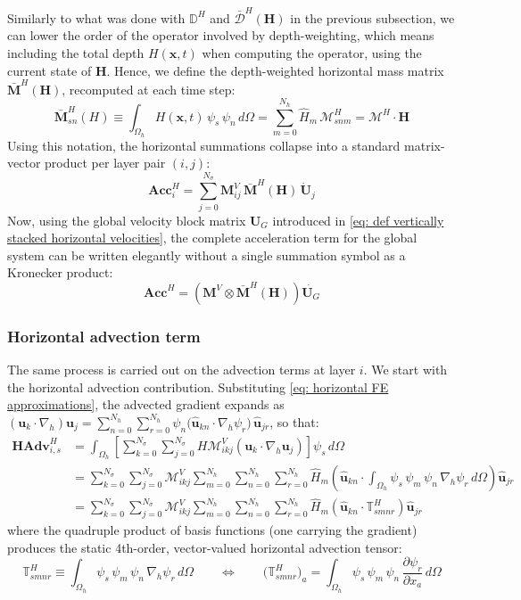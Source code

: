 \documentclass{article}
\newcommand{\Ns}{N_\sigma}
\newcommand{\uj}{\mathbf{u}_j}
\newcommand{\uk}{\mathbf{u}_k}
\newcommand{\sumj}{\sum_{j=0}^{\Ns}}
\newcommand{\sumk}{\sum_{k=0}^{\Ns}}
\newcommand{\nablah}{\nabla_h}
\newcommand{\VMij}{\mathbf{M}_{ij}^V}
\newcommand{\VMikj}{\boldsymbol{\mathcal{M}}_{ikj}^V}
\newcommand{\VmM}{\mathbf{M}^V}
\newcommand{\Nh}{N_h}
\newcommand{\sumNhr}{\sum_{r=0}^{\Nh}}
\newcommand{\sumNhn}{\sum_{n=0}^{\Nh}}
\newcommand{\sumNhm}{\sum_{m=0}^{\Nh}}
\newcommand{\uhkn}{\hat{\mathbf{u}}_{kn}}
\newcommand{\uhjr}{\hat{\mathbf{u}}_{jr}}
\newcommand{\Hm}{\hat{H}_m}
\newcommand{\ddxa}[1]{\frac{\partial #1}{\partial x_a}}
\newcommand{\HMsnm}{\boldsymbol{\mathcal{M}}_{snm}^H}
\newcommand{\HtM}{\boldsymbol{\mathcal{M}}^H}
\newcommand{\HtDdwH}{\bar{\boldsymbol{\mathcal{D}}}^H(\Hvec)}
\newcommand{\HmMdwH}{\bar{\mathbf{M}}^H(\Hvec)}
\newcommand{\HttD}{\mathbb{D}^H}
\newcommand{\Hvec}{\mathbf{H}}
\newcommand{\Ublock}{\mathbf{U}_G}
\begin{document}
Similarly to what was done with $\HttD$ and $\HtDdwH$ in the previous subsection, we can lower the order of the operator involved by depth-weighting, which means including the total depth $H(\mathbf{x},t)$ when computing the operator, using the current state of $\mathbf{H}$.
Hence, we define the depth-weighted horizontal mass matrix $\HmMdwH$, recomputed at each time step:
\begin{equation}
    \boxed{\bar{\mathbf{M}}_{sn}^H(H) \equiv \int_{\Omega_h} H(\mathbf{x}, t) \, \psi_s \, \psi_n \, d\Omega = \sumNhm \Hm \, \HMsnm = \HtM \cdot \Hvec}
    \label{eq: def depth weighted horizontal mass}
\end{equation}
Using this notation, the horizontal summations collapse into a standard matrix-vector product per layer pair $(i,j)$:
$$\mathbf{Acc}_{i}^H = \sumj \VMij \, \HmMdwH \, \dot{\mathbf{U}}_j$$
Now, using the global velocity block matrix $\Ublock$ introduced in \eqref{eq: def vertically stacked horizontal velocities}, the complete acceleration term for the global system can be written elegantly without a single summation symbol as a Kronecker product:
\begin{equation}
    \mathbf{Acc}^H = \left( \VmM \otimes \HmMdwH \right) \dot{\Ublock}
    \label{eq: discrete acceleration Kronecker}
\end{equation}



\subsubsection*{Horizontal advection term}

The same process is carried out on the advection terms at layer $i$. We start with the horizontal advection contribution. Substituting \eqref{eq: horizontal FE approximations}, the advected gradient expands as $(\uk\cdot\nablah)\uj = \sumNhn\sumNhr \psi_n \big(\uhkn\cdot\nablah\psi_r\big)\,\uhjr$, so that:
\begin{align*}
    \mathbf{HAdv}_{i,s}^H &= \int_{\Omega_h} \left[\sumk\sumj H\VMikj(\uk\cdot\nablah\uj)\right]\psi_s\,d\Omega \\
    &= \sumk\sumj \VMikj \sumNhm \sumNhn \sumNhr \Hm \left(\uhkn \cdot \int_{\Omega_h} \psi_s\, \psi_m\, \psi_n\, \nablah \psi_r \,d\Omega \right) \uhjr \\
    &= \sumk\sumj \VMikj \sumNhm \sumNhn \sumNhr \Hm \left(\uhkn \cdot \mathbb{T}^H_{smnr}\right) \uhjr
\end{align*}
where the quadruple product of basis functions (one carrying the gradient) produces the static 4th-order, vector-valued horizontal advection tensor:
\begin{equation}
    \boxed{\mathbb{T}^H_{smnr} \equiv \int_{\Omega_h}\psi_s\,\psi_m\,\psi_n\,\nablah\psi_r\,d\Omega
    \qquad\Longleftrightarrow\qquad
    \big(\mathbb{T}^H_{smnr}\big)_a = \int_{\Omega_h}\psi_s\,\psi_m\,\psi_n\,\ddxa{\psi_r}\,d\Omega}
    \label{eq: def horizontal 4th order tensor}
\end{equation}
\end{document}
